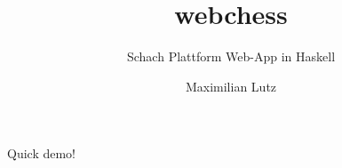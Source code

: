 \documentclass{beamer}
\title{webchess}
\subtitle{Schach Plattform Web-App in Haskell}
\author{Maximilian Lutz}
\begin{document}
\maketitle






\begin{frame}[plain,c]
\begin{center}
\Huge Quick demo!
\end{center}
\end{frame}






\end{document}
